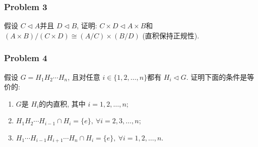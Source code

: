 \documentclass[a4paper,12pt]{ctexart}
\newcommand{\Z}{\mathbf{Z}}
\begin{document}
\subsubsection*{Problem 3}
    假设 $ C\triangleleft A $并且 $ D\triangleleft B $, 证明: $ C\times D\triangleleft A\times B $和 $ (A\times B)/(C\times D)\cong(A/C)\times(B/D) $ (直积保持正规性).
    

\subsubsection*{Problem 4}
    假设 $ G=H_1H_2\cdots H_n $, 且对任意 $ i\in\{1,2,\dots,n\} $都有 $ H_i\triangleleft G $. 证明下面的条件是等价的:
    \begin{enumerate}
      \item $ G $是 $ H_i $的内直积, 其中 $ i=1,2,\dots,n $;
      \item $ H_1H_2\cdots H_{i-1}\cap H_i=\{e\},~\forall i=2,3,\dots,n $;
      \item $ H_1\cdots H_{i-1}H_{i+1}\cdots H_n\cap H_i=\{e\},~\forall i=1,2,\dots,n $.
    \end{enumerate}

    
 
\end{document}
